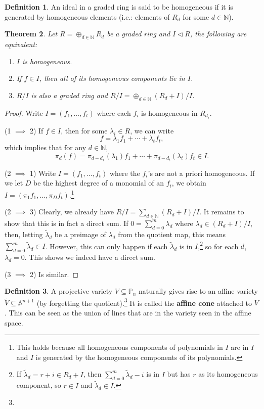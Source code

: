 \documentclass{tufte-handout} %
\newtheorem{thm}{Theorem}
\theoremstyle{definition}
\newtheorem{defn}[thm]{Definition}
\theoremstyle{remark}
\newcommand{\N}{\mathbb{N}}
\newcommand{\bA}{\mathbb{A}}
\renewcommand{\P}{\mathbb{P}}
\begin{document}
\begin{defn}
	An ideal in a graded ring is said to be homogeneous if it is generated by homogeneous elements (i.e.: elements of $R_d$ for some $d \in \N$).
\end{defn}
\begin{thm}\label{homogenequiv}
	Let $R= \oplus_{d\in \N} R_d$ be a graded ring and $I \lhd R$, the following are equivalent:\begin{enumerate}
		\item $I$ is homogeneous.
		\item If $f \in I$, then all of its homogeneous components lie in $I$.
		\item $R/I$ is also a graded ring and
		$R/I = \oplus_{d \in \N} (R_d+I)/I$.
	\end{enumerate}
\end{thm}
\begin{proof}
	Write $I = (f_1, \dots, f_t)$ where each $f_i$ is homogeneous in $R_{d_i}$.
	
	(1 $\implies$ 2) If $f \in I$, then for some $\lambda_i \in R$, we can write \[f = \lambda_1f_1 + \cdots +\lambda_tf_t,\]
	which implies that for any $d \in \N$, \[\pi_d(f) = \pi_{d-d_1}(\lambda_1) f_1 + \cdots + \pi_{d-d_t}(\lambda_t)f_t \in I.\]
	
	(2 $\implies$ 1) Write $I = (f_1, \dots, f_t)$ where the $f_i$'s are not a priori homogeneous. If we let $D$ be the highest degree of a monomial of an $f_i$, we obtain $I = (\pi_1 f_1, \dots, \pi_D f_t)$.\footnote{This holds because all homogeneous components of polynomials in $I$ are in $I$ and $I$ is generated by the homogeneous components of its polynomials.}
	
	(2 $\implies$ 3) Clearly, we already have $R/I = \sum_{d \in \N} (R_d+I)/I$. It remains to show that this is in fact a direct sum. If $0 = \sum_{d=0}^m \lambda_d$ where $\lambda_d \in (R_d+I)/I$, then, letting $\widetilde{\lambda}_d$ be a preimage of $\lambda_d$ from the quotient map, this means $\sum_{d=0}^m \widetilde{\lambda}_d \in I$. However, this can only happen if each $\widetilde{\lambda}_d$ is in $I$,\footnote{If $\widetilde{\lambda}_d = r+i \in R_d+I$, then $\sum_{d=0}^m \widetilde{\lambda}_d - i$ is in $I$ but has $r$ as its homogeneous component, so $r \in I$ and $\widetilde{\lambda}_d \in I$.} so for each $d$, $\lambda_d  = 0$. This shows we indeed have a direct sum.
	
	(3 $\implies$ 2) Is similar. %
\end{proof}
\begin{defn}
	A projective variety $V \subseteq \P_n$ naturally gives rise to an affine variety $\widetilde{V} \subseteq \bA^{n+1}$ (by forgetting the quotient).\footnote{%
	} It is called the \textbf{affine cone} attached to $V$. This can be seen as the union of lines that are in the variety seen in the affine space.%
\end{defn}
\end{document}
